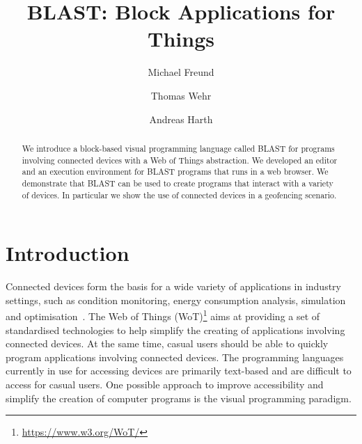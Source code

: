 \documentclass[runningheads]{llncs}
\begin{document}
%
\title{BLAST: Block Applications for Things}
%
%
\author{Michael Freund \and
Thomas Wehr \and
Andreas Harth}
%
%
%
\maketitle              %
%
\begin{abstract}
  We introduce a block-based visual programming language called BLAST for programs involving connected devices with a Web of Things abstraction.
  We developed an editor and an execution environment for BLAST programs that runs in a web browser.
  We demonstrate that BLAST can be used to create programs that interact with a variety of devices.
  In particular we show the use of connected devices in a geofencing scenario.
\end{abstract}
%
%
%
\setcounter{footnote}{0}
\section{Introduction}
Connected devices form the basis for a wide variety of applications in industry settings, such as condition monitoring, energy consumption analysis, simulation and optimisation~\cite{CIMINO2019103130}.
The Web of Things (WoT)\footnote{\url{https://www.w3.org/WoT/}} aims at providing a set of standardised technologies to help simplify the creating of applications involving connected devices.
At the same time, casual users should be able to quickly program applications involving connected devices.
The programming languages currently in use for accessing devices are primarily text-based and are difficult to access for casual users.
One possible approach to improve accessibility and simplify the creation of computer programs is the visual programming paradigm.
\end{document}
